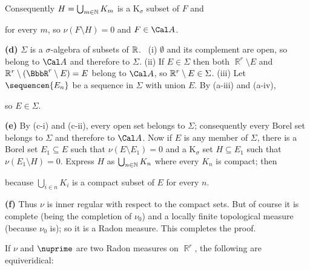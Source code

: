 {

\noindent Consequently $H=\bigcup_{m\in\Bbb N}K_m$ is a K$_{\sigma}$
subset of $F$ and


\noindent for every $m$, so $\nu(F\setminus H)=0$ and $F\in\Cal A$.\ \Qed

\medskip

{\bf (d)} $\Sigma$ is a $\sigma$-algebra of subsets of $\Bbb R$.
\Prf\ {(i)} $\emptyset$ and its complement are open, so belong to $\Cal
A$ and therefore to $\Sigma$.
{(ii)} If $E\in\Sigma$ then both $\BbbR^r\setminus E$ and $\Bbb
R^r\setminus(\BbbR^r\setminus E)=E$ belong to $\Cal A$, so $\Bbb
R^r\setminus E\in\Sigma$.   {(iii)} Let $\sequencen{E_n}$ be a
sequence in $\Sigma$ with union $E$.   By (a-iii) and (a-iv),


\noindent so $E\in\Sigma$.\  \Qed

\medskip

{\bf (e)} By (c-i) and (c-ii), every open set belongs to $\Sigma$;
consequently every Borel set
belongs to $\Sigma$ and therefore to $\Cal A$.   Now if $E$ is any
member
of $\Sigma$, there is a Borel set $E_1\subseteq E$ such that
$\nu(E\setminus E_1)=0$ and a K$_{\sigma}$ set $H\subseteq E_1$ such
that $\nu(E_1\setminus H)=0$.   Express $H$ as $\bigcup_{n\in\Bbb N}K_n$
where every $K_n$ is compact;  then


\noindent because $\bigcup_{i\in n}K_i$ is a compact subset of $E$ for
every $n$.

\medskip

{\bf (f)} Thus $\nu$ is inner regular with respect to the compact sets.
But of course it is complete (being the completion of $\nu_0$) and  a
locally
finite topological measure (because $\nu_0$ is);  so it is a Radon
measure.   This completes the proof.
}%

 If $\nu$ and $\nuprime$ are two Radon
measures on $\BbbR^r$, the following are equiveridical:

